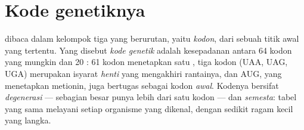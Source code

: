 \section{Kode genetiknya}

\begin{definition}\label{def:g11:gene-expression:code}
 dibaca dalam kelompok tiga  yang berurutan, yaitu
\emph{kodon}, dari sebuah titik awal yang tertentu. Yang
disebut \emph{kode genetik} adalah kesepadanan
antara 64 kodon yang mungkin dan 20 : 61 kodon menetapkan
satu , tiga kodon (UAA, UAG, UGA) merupakan isyarat
\emph{henti} yang mengakhiri rantainya, dan AUG, yang menetapkan
metionin, juga bertugas sebagai kodon \emph{awal}. Kodenya bersifat
\emph{degenerasi} --- sebagian besar  punya lebih dari
satu kodon --- dan \emph{semesta}: tabel yang sama melayani setiap organisme yang
dikenal, dengan sedikit ragam kecil yang langka.
\end{definition}

